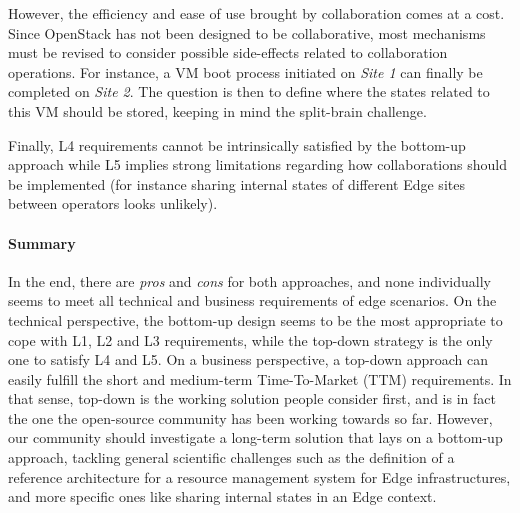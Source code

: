 However, the efficiency and ease of use brought by collaboration comes at a
cost. Since OpenStack has not been designed to be collaborative, most
mechanisms must be revised to consider possible side-effects related to
collaboration operations.
%
For instance, a VM boot process initiated on \emph{Site 1} can finally be
completed on \emph{Site 2}. The question is then to define where the states
related to this VM should be stored, keeping in mind the split-brain
challenge.

Finally, L4 requirements cannot be intrinsically satisfied by the
bottom-up approach while L5 implies strong limitations regarding how
collaborations should be implemented (for instance sharing internal
states of different Edge sites between operators looks unlikely).

%



\paragraph{Summary}
In the end, there are \emph{pros} and \emph{cons} for both approaches,
and none individually seems to meet all technical and business
requirements of edge scenarios.
On the technical perspective, the bottom-up
design seems to be the most appropriate to cope with L1, L2 and L3
requirements, while the top-down strategy is the only one to satisfy L4
and L5.
%
On a business perspective, a top-down approach can easily fulfill the
short and medium-term Time-To-Market (TTM) requirements. In that
sense, top-down is the working solution people consider first, and is
in fact the one the open-source community has been working towards so
far. However, our community should investigate a long-term solution
that lays on a bottom-up approach, tackling general scientific
challenges such as the definition of a reference architecture for a
resource management system for Edge infrastructures, and more specific
ones like sharing internal states in an Edge context.







